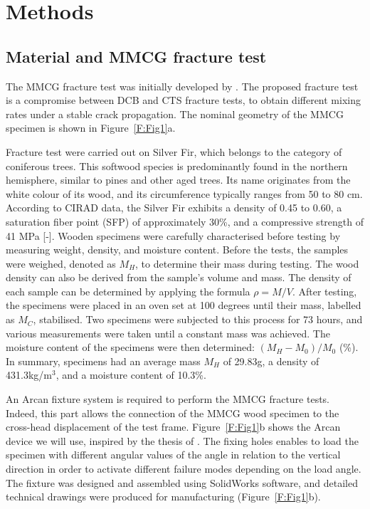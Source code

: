 \documentclass[3p,times,procedia]{elsarticle}
\begin{document}
\section{Methods}\label{S:method}

\subsection{Material and MMCG fracture test}\label{Ss:spec}

The MMCG fracture test was initially developed by \citet{MoutouPitti2008}. The proposed fracture test is a compromise between DCB and CTS fracture tests, to obtain different mixing rates under a stable crack propagation. The nominal geometry of the MMCG specimen is shown in Figure~\ref{F:Fig1}a.


Fracture test were carried out on Silver Fir, which belongs to the category of coniferous trees. This softwood species is predominantly found in the northern hemisphere, similar to pines and other aged trees. Its name originates from the white colour of its wood, and its circumference typically ranges from 50 to 80 cm. According to CIRAD data, the Silver Fir exhibits a density of 0.45 to 0.60, a saturation fiber point (SFP) of approximately 30\%, and a compressive strength of 41 MPa [-].
Wooden specimens were carefully characterised before testing by measuring weight, density, and moisture content. Before the tests, the samples were weighed, denoted as $M_H$, to determine their mass during testing. The wood density can also be derived from the sample's volume and mass. The density of each sample can be determined by applying the formula $\rho = M/V$.
After testing, the specimens were placed in an oven set at 100 degrees until their mass, labelled as $M_C$, stabilised. Two specimens were subjected to this process for 73 hours, and various measurements were taken until a constant mass was achieved. The moisture content of the specimens were then determined: $(M_{H}-M_{0})/M_{0}$ (\%). In summary, specimens had an average mass $M_H$ of 29.83g, a density of 431.3kg/m$^3$, and a moisture content of 10.3\%.

An Arcan fixture system is required to perform the MMCG fracture tests. Indeed, this part allows the connection of the MMCG wood specimen to the cross-head displacement of the test frame. Figure~\ref{F:Fig1}b shows the Arcan device we will use, inspired by the thesis of \citep{Odounga2018phd}. The fixing holes enables to load the specimen with different angular values of the angle in relation to the vertical direction in order to activate different failure modes depending on the load angle.  The fixture was designed and assembled using SolidWorks software, and detailed technical drawings were produced for manufacturing (Figure~\ref{F:Fig1}b).
\end{document}
